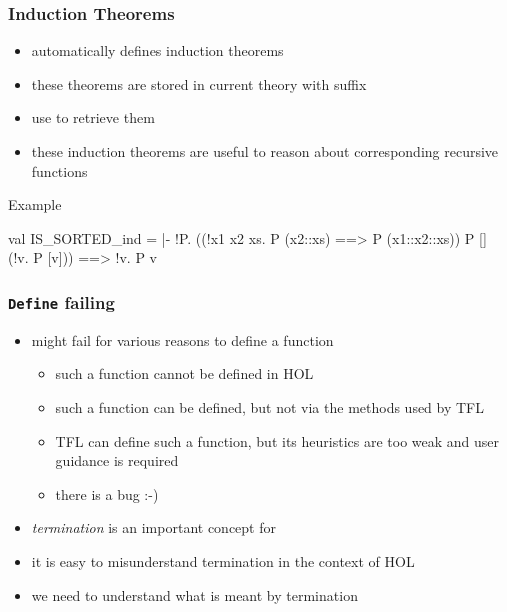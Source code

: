 \begin{frame}[fragile]
\frametitle{Induction Theorems}
\begin{itemize}
\item {} automatically defines induction theorems
\item these theorems are stored in current theory with suffix 
\item use  to retrieve them
\item these induction theorems are useful to reason about corresponding recursive functions
\end{itemize}
\begin{block}{Example}
\begin{semiverbatim}\scriptsize
val IS_SORTED_ind = |- !P.
     ((!x1 x2 xs. P (x2::xs) ==> P (x1::x2::xs)) \holAnd{} 
      P [] \holAnd{} 
      (!v. P [v])) ==>
     !v. P v
\end{semiverbatim}
\end{block}
\end{frame}


\begin{frame}[fragile]
\frametitle{\texttt{Define} failing}
\begin{itemize}
\item {} might fail for various reasons to define a function
\begin{itemize}
\item such a function cannot be defined in HOL
\item such a function can be defined, but not via the methods used by TFL
\item TFL can define such a function, but its heuristics are too weak and user guidance is required
\item there is a bug :-)
\end{itemize}
\item \emph{termination} is an important concept for 
\item it is easy to misunderstand termination in the context of HOL
\item we need to understand what is meant by termination 
\end{itemize}
\end{frame}

